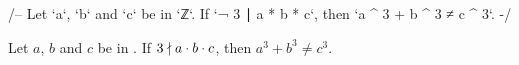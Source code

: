 /--
  Let `a`, `b` and `c` be in `ℤ`.
  If `¬ 3 ∣ a * b * c`, then `a ^ 3 + b ^ 3 ≠ c ^ 3`.
-/

\begin{theorem}
    \label{thm:fermatLastTheoremThree_case1}
    \leanok
    Let \(a\), \(b\) and \(c\) be in \Z. If \(3 \nmid a \cdot b \cdot c\), then \(a ^ 3 + b ^ 3 \neq c ^ 3\).
  \end{theorem}

